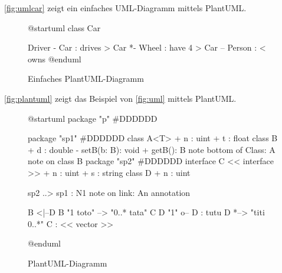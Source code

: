 \autoref{fig:umlcar} zeigt ein einfaches UML-Diagramm mittels PlantUML.

\begin{figure}
  \centering
  \begin{plantuml}
  @startuml
    class Car

    Driver - Car : drives >
    Car *- Wheel : have 4 >
    Car -- Person : < owns
  @enduml
  \end{plantuml}
  \caption{Einfaches PlantUML-Diagramm}
  \label{fig:umlcar}
\end{figure}

\autoref{fig:plantuml} zeigt das Beispiel von \autoref{fig:uml} mittels PlantUML.

\begin{figure}
  \centering
  \begin{plantuml}
    @startuml
    package "p" #DDDDDD {
      package "sp1" #DDDDDD {
        class A<T> {
          + n : uint
          + t : float
        }
        class B {
          + d : double
          - setB(b: B): void
          + getB(): B
        }
        note bottom of Class: A note on class B
      }
      package "sp2" #DDDDDD {
        interface  C << interface >> {
          + n : uint
          + s : string
        }
      }
      class D {
        + n : uint
      }

      sp2 ..> sp1 : N1
      note on link: An annotation

      B <|--D
      B "1 toto" --> "0..* tata" C
      D "1" o-- D : tutu
      D *--> "titi 0..*" C : << vector >>
    }
    @enduml
  \end{plantuml}
  \caption{PlantUML-Diagramm}
  \label{fig:plantuml}
\end{figure}
